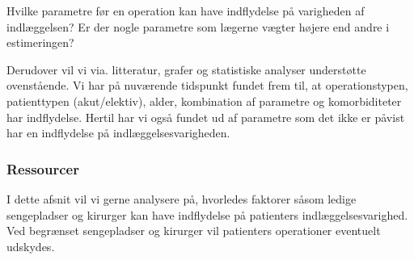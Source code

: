Hvilke parametre før en operation kan have indflydelse på varigheden af indlæggelsen? Er der nogle parametre som lægerne vægter højere end andre i estimeringen? 


Derudover vil vi via. litteratur, grafer og statistiske analyser understøtte ovenstående. Vi har på nuværende tidspunkt fundet frem til, at operationstypen, patienttypen (akut/elektiv), alder,  kombination af parametre og komorbiditeter har indflydelse. Hertil har vi også fundet ud af parametre som det ikke er påvist har en indflydelse på indlæggelsesvarigheden.


\subsubsection{Ressourcer}
I dette afsnit vil vi gerne analysere på, hvorledes faktorer såsom ledige sengepladser og kirurger kan have indflydelse på patienters indlæggelsesvarighed. Ved begrænset sengepladser og kirurger vil patienters operationer eventuelt udskydes. 